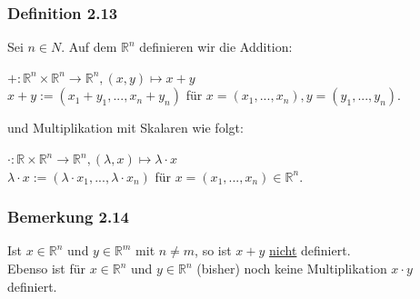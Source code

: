 \documentclass{article}
\begin{document}
\subsubsection*{Definition 2.13}
Sei $n \in N$. Auf dem $\mathbb{R}^n$ definieren wir die Addition:\\
\begin{center}
    $+: \mathbb{R}^n \times \mathbb{R}^n \rightarrow \mathbb{R}^n, (x,y) \mapsto x+y$ \\
    $x+y:= (x_1+y_1, ..., x_n+y_n)$ für $ x=(x_1, ..., x_n), y=(y_1, ..., y_n).$ \\
\end{center}
und Multiplikation mit Skalaren wie folgt: \\
\begin{center}
    $\cdot: \mathbb{R} \times \mathbb{R}^n \rightarrow \mathbb{R}^n, (\lambda, x) \mapsto \lambda \cdot x$ \\
    $\lambda \cdot x := (\lambda \cdot x_1, ..., \lambda \cdot x_n)$ für $ x=(x_1, ..., x_n) \in \mathbb{R}^n.$ \\
\end{center}

\subsubsection*{Bemerkung 2.14}
Ist $x \in \mathbb{R}^n$ und $y \in \mathbb{R}^m$ mit $n \neq m$, so ist $x+y$ \underline{nicht} definiert. \\
Ebenso ist für $x \in \mathbb{R}^n$ und $y \in \mathbb{R}^n$ (bisher) noch keine Multiplikation $x \cdot y$ definiert. \\
\\
\end{document}
